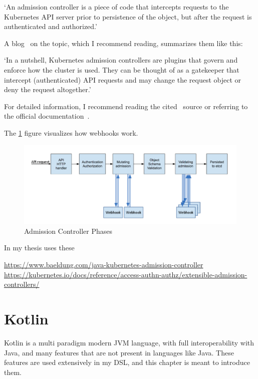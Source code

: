 `An admission controller is a piece of code that intercepts requests to the Kubernetes API server prior to persistence of the object, but after the request is authenticated and authorized.'

A blog~\cite{K8sAdmissionBlog} on the topic, which I recommend reading, summarizes them like this:

`In a nutshell, Kubernetes admission controllers are plugins that govern and enforce how the cluster is used. They can be thought of as a gatekeeper that intercept (authenticated) API requests and may change the request object or deny the request altogether.' 

For detailed information, I recommend reading the cited~\cite{K8sAdmissionBlog} source or referring to the official documentation~\cite{K8sAdmissionOfficial}.

The \ref{fig:dynadm} figure visualizes how webhooks work. 

\begin{figure}[h]
    \centering
    \includegraphics[width=130mm, keepaspectratio]{content/10_prerequisites/dynadm.png}
    \caption{Admission Controller Phases~\cite{K8sAdmissionBlog}}
    \label{fig:dynadm}
\end{figure}

In my thesis uses these 

\url{https://www.baeldung.com/java-kubernetes-admission-controller}
\url{https://kubernetes.io/docs/reference/access-authn-authz/extensible-admission-controllers/}



\section{Kotlin}

Kotlin is a multi paradigm modern JVM language, with full interoperability with Java, and many features that are not present in languages like Java. These features are used extensively in my DSL, and this chapter is meant to introduce them.

